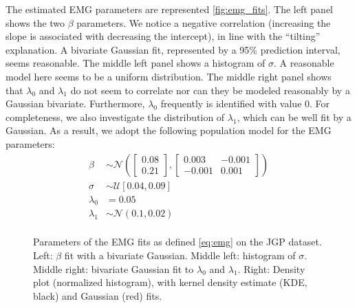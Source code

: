 \documentclass[12pt,a4paper]{article}
\begin{document}
The estimated EMG parameters are represented \autoref{fig:emg_fits}. The left panel shows the two $\beta$ parameters. We notice a negative correlation (increasing the slope is associated with decreasing the intercept), in line with the ``tilting'' explanation. A bivariate Gaussian fit, represented by a 95\% prediction interval, seems reasonable. The middle left panel shows a histogram of $\sigma$. A reasonable model here seems to be a uniform distribution. The middle right panel shows that $\lambda_0$ and $\lambda_1$ do not seem to correlate nor can they be modeled reasonably by a Gaussian bivariate. Furthermore, $\lambda_0$ frequently is identified with value 0. For completeness, we also investigate the distribution of $\lambda_1$, which can be well fit by a Gaussian. As a result, we adopt the following population model for the EMG parameters:
\begin{align}
	\beta     & \sim \mathcal{N}\left( \begin{bmatrix}
			                                   0.08 \\ 0.21
		                                   \end{bmatrix}, \begin{bmatrix}
			                                                  0.003 & -0.001 \\ -0.001 & 0.001
		                                                  \end{bmatrix} \right) \\
	\sigma    & \sim \mathcal{U}[0.04, 0.09]                                          \\
	\lambda_0 & = 0.05                                                                \\
	\lambda_1 & \sim \mathcal{N}(0.1, 0.02)                                           \\
\end{align}


\begin{figure}[htbp]
	\centering
	\caption{Parameters of the EMG fits as defined \autoref{eq:emg} on the JGP dataset. Left: $\beta$ fit with a bivariate Gaussian. Middle left: histogram of $\sigma$. Middle right: bivariate Gaussian fit to $\lambda_0$ and $\lambda_1$. Right: Density plot (normalized histogram), with kernel density estimate (KDE, black) and Gaussian (red) fits.}
	\label{fig:emg_fits}
\end{figure}
\end{document}

